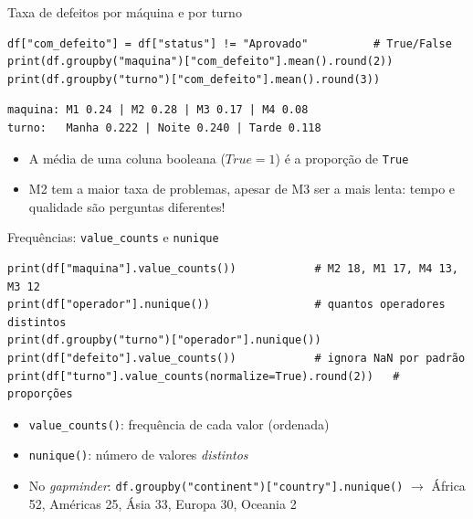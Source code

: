 \documentclass[aspectratio=169,10pt,t]{beamer}
\begin{document}
\begin{frame}[fragile]{Taxa de defeitos por máquina e por turno}
\begin{lstlisting}
df["com_defeito"] = df["status"] != "Aprovado"          # True/False
print(df.groupby("maquina")["com_defeito"].mean().round(2))
print(df.groupby("turno")["com_defeito"].mean().round(3))
\end{lstlisting}
\begin{lstlisting}[style=saida,basicstyle=\ttfamily\scriptsize]
maquina: M1 0.24 | M2 0.28 | M3 0.17 | M4 0.08
turno:   Manha 0.222 | Noite 0.240 | Tarde 0.118
\end{lstlisting}
  \begin{itemize}\small
    \item A média de uma coluna booleana (\(True=1\)) é a \alert{proporção} de \texttt{True}
    \item M2 tem a maior taxa de problemas, apesar de M3 ser a mais lenta: tempo e qualidade são perguntas diferentes!
  \end{itemize}
\end{frame}

\begin{frame}[fragile]{Frequências: \texttt{value\_counts} e \texttt{nunique}}
\begin{lstlisting}
print(df["maquina"].value_counts())            # M2 18, M1 17, M4 13, M3 12
print(df["operador"].nunique())                # quantos operadores distintos
print(df.groupby("turno")["operador"].nunique())
print(df["defeito"].value_counts())            # ignora NaN por padrão
print(df["turno"].value_counts(normalize=True).round(2))   # proporções
\end{lstlisting}
  \begin{itemize}
    \item \texttt{value\_counts()}: frequência de cada valor (ordenada)
    \item \texttt{nunique()}: número de valores \emph{distintos}
    \item No \emph{gapminder}: \texttt{df.groupby("continent")["country"].nunique()} \(\to\) África 52, Américas 25, Ásia 33, Europa 30, Oceania 2
  \end{itemize}
\end{frame}
\end{document}
